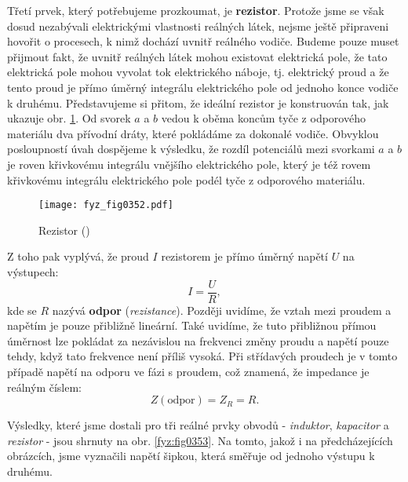 
  Třetí prvek, který potřebujeme prozkoumat, je \textbf{rezistor}. Protože jsme se však dosud 
  nezabývali elektrickými vlastnosti reálných látek, nejsme ještě připraveni hovořit o procesech, k 
  nimž dochází uvnitř reálného vodiče. Budeme pouze muset přijmout fakt, že uvnitř reálných látek 
  mohou existovat elektrická pole, že tato elektrická pole mohou vyvolat tok elektrického náboje, 
  tj. elektrický proud a že tento proud je přímo úměrný integrálu elektrického pole od jednoho 
  konce vodiče k druhému. Představujeme si přitom, že ideální rezistor je konstruován tak, jak 
  ukazuje obr. \ref{fyz:fig0352}. Od svorek \(a\) a \(b\) vedou k oběma koncům tyče z odporového 
  materiálu dva přívodní dráty, které pokládáme za dokonalé vodiče. Obvyklou posloupností úvah 
  dospějeme k výsledku, že rozdíl potenciálů mezi svorkami \(a\) a \(b\) je roven křivkovému 
  integrálu vnějšího elektrického pole, který je též rovem křivkovému integrálu elektrického pole 
  podél tyče z odporového materiálu.
  
  \begin{figure}[ht!] %
    \centering
    \texttt{[image: fyz\_fig0352.pdf]}
    \caption{Rezistor
             (\cite[s.~394]{Feynman02})}
    \label{fyz:fig0352}
  \end{figure}
  
  Z toho pak vyplývá, že proud \(I\) rezistorem je přímo úměrný napětí \(U\) na výstupech:
  \begin{equation*}
    I = \frac{U}{R},
  \end{equation*}
  kde se \(R\) nazývá \textbf{odpor} (\emph{rezistance}). Později uvidíme, že vztah mezi proudem a 
  napětím je pouze přibližně lineární. Také uvidíme, že tuto přibližnou přímou úměrnost lze 
  pokládat za nezávislou na frekvenci změny proudu a napětí pouze tehdy, když tato frekvence není 
  příliš vysoká. Při střídavých proudech je v tomto případě napětí na odporu ve fázi s proudem, což 
  znamená, že impedance je reálným číslem:
  \begin{equation}\label{fyz:eq477}
    Z(\text{odpor}) = Z_R = R.
  \end{equation}
  
  Výsledky, které jsme dostali pro tři reálné prvky obvodů - \emph{induktor}, \emph{kapacitor} a 
  \emph{rezistor} - jsou shrnuty na obr. \ref{fyz:fig0353}. Na tomto, jakož i na předcházejících 
  obrázcích, jsme vyznačili napětí šipkou, která směřuje od jednoho výstupu k druhému.

